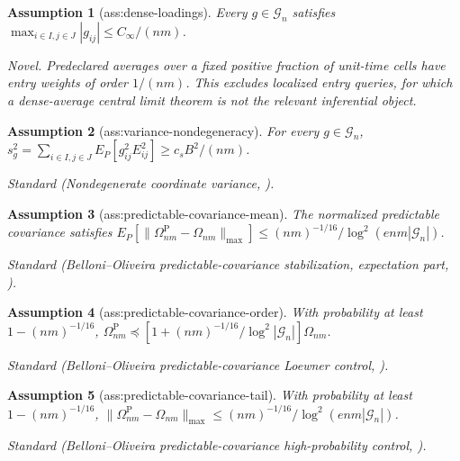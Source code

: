 \documentclass{article}
\newtheorem{assumption}{Assumption}
\begin{document}
\begin{assumption}[ass:dense-loadings]\label{ass:dense-loadings}
Every \(g\in\mathcal G_n\) satisfies \(\max_{i\in I,j\in J}|g_{ij}|\le C_\infty/(nm)\).
\par\smallskip\noindent\emph{Novel.} Predeclared averages over a fixed positive fraction of unit-time cells have entry weights of order \(1/(nm)\). This excludes localized entry queries, for which a dense-average central limit theorem is not the relevant inferential object.
\end{assumption}

\begin{assumption}[ass:variance-nondegeneracy]\label{ass:variance-nondegeneracy}
For every \(g\in\mathcal G_n\), \(s_g^2=\sum_{i\in I,j\in J}E_P[g_{ij}^2E_{ij}^2]\ge c_sB^2/(nm)\).
\par\smallskip\noindent\emph{Standard} (Nondegenerate coordinate variance, \cite{BelloniOliveira2018MartingaleCLT}).
\end{assumption}

\begin{assumption}[ass:predictable-covariance-mean]\label{ass:predictable-covariance-mean}
The normalized predictable covariance satisfies \(E_P[\lVert\Omega^{\mathrm P}_{nm}-\Omega_{nm}\rVert_{\max}]\le (nm)^{-1/16}/\log^2(enm|\mathcal G_n|)\).
\par\smallskip\noindent\emph{Standard} (Belloni--Oliveira predictable-covariance stabilization, expectation part, \cite{BelloniOliveira2018MartingaleCLT}).
\end{assumption}

\begin{assumption}[ass:predictable-covariance-order]\label{ass:predictable-covariance-order}
With probability at least \(1-(nm)^{-1/16}\), \(\Omega^{\mathrm P}_{nm}\preceq[1+(nm)^{-1/16}/\log^2|\mathcal G_n|]\Omega_{nm}\).
\par\smallskip\noindent\emph{Standard} (Belloni--Oliveira predictable-covariance Loewner control, \cite{BelloniOliveira2018MartingaleCLT}).
\end{assumption}

\begin{assumption}[ass:predictable-covariance-tail]\label{ass:predictable-covariance-tail}
With probability at least \(1-(nm)^{-1/16}\), \(\lVert\Omega^{\mathrm P}_{nm}-\Omega_{nm}\rVert_{\max}\le(nm)^{-1/16}/\log^2(enm|\mathcal G_n|)\).
\par\smallskip\noindent\emph{Standard} (Belloni--Oliveira predictable-covariance high-probability control, \cite{BelloniOliveira2018MartingaleCLT}).
\end{assumption}
\end{document}
